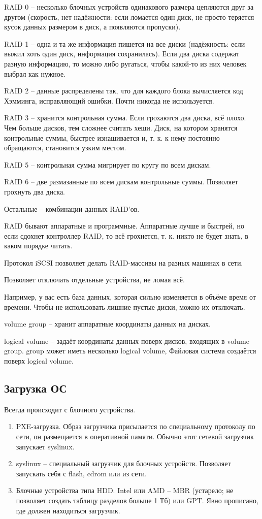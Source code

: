 \documentclass[a4paper,10pt]{article}
\begin{document}
RAID 0 -- несколько блочных устройств одинакового размера цепляются друг за другом (скорость, нет надёжности: если ломается один диск, не просто теряется кусок данных размером в диск, а появляются пропуски).

RAID 1 -- одна и та же информация пишется на все диски (надёжность: если выжил хоть один диск, информация сохранилась). Если два диска содержат разную информацию, то можно либо ругаться, чтобы какой-то из них человек выбрал как нужное.

RAID 2 -- данные распределены так, что для каждого блока вычисляется код Хэмминга, исправляющий ошибки. Почти никогда не используется.

RAID 3 -- хранится контрольная сумма. Если грохаются два диска, всё плохо. Чем больше дисков, тем сложнее считать хеши. Диск, на котором хранятся контрольные суммы, быстрее изнашивается и, т. к. к нему постоянно обращаются, становится узким местом.

RAID 5 -- контрольная сумма мигрирует по кругу по всем дискам.

RAID 6 -- две размазанные по всем дискам контрольные суммы. Позволяет грохнуть два диска.

Остальные -- комбинации данных RAID'ов.

RAID бывают аппаратные и программные. Аппаратные лучше и быстрей, но если сдохнет контроллер RAID, то всё грохнется, т. к. никто не будет знать, в каком порядке читать. 

Протокол iSCSI позволяет делать RAID-массивы на разных машинах в сети.

Позволяет отключать отдельные устройства, не ломая всё.

Например, у вас есть база данных, которая сильно изменяется в объёме время от времени. Чтобы не использовать лишние пустые диски, можно их отключать.

volume group -- хранит аппаратные координаты данных на дисках.

logical volume -- задаёт координаты данных поверх дисков, входящих в volume group. group может иметь несколько logical volume, Файловая система создаётся поверх logical volume.

\subsection{Загрузка ОС}
Всегда происходит с блочного устройства. 
\begin{enumerate}
\item PXE-загрузка. Образ загрузчика присылается по специальному протоколу по сети, он размещается в оперативной памяти. Обычно этот сетевой загрузчик запускает syslinux.
\item syslinux -- специальный загрузчик для блочных устройств.
Позволяет запускать себя с flash, cdrom или из сети.
\item Блочные устройства типа HDD. Intel или AMD  -- MBR (устарело; не позволяет создать таблицу разделов больше 1 Тб) или GPT. Явно прописано, где должен находиться загрузчик. 
\end{enumerate}
\end{document}
